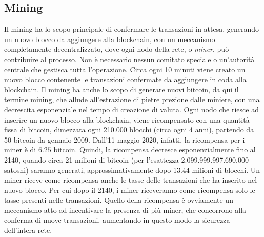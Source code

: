 \subsection{Mining}
Il mining ha lo scopo principale di confermare le transazioni in attesa, generando un nuovo blocco da aggiungere alla blockchain, con un meccanismo completamente decentralizzato, dove ogni nodo della rete, o \emph{miner}, può contribuire al processo. Non è necessario nessun comitato speciale o un'autorità centrale che gestisca tutta l'operazione. Circa ogni 10 minuti viene creato un nuovo blocco contenente le transazioni confermate da aggiungere in coda alla blockchain.
Il mining ha anche lo scopo di generare nuovi bitcoin, da qui il termine mining, che allude all'estrazione di pietre prezione dalle miniere, con una decrescita esponenziale nel tempo di creazione di valuta. Ogni nodo che riesce ad inserire un nuovo blocco alla blockchain, viene ricompensato con una quantità fissa di bitcoin, dimezzata ogni 210.000 blocchi (circa ogni 4 anni), partendo da 50 bitcoin da gennaio 2009. Dall'11 maggio 2020, infatti, la ricompensa per i miner è di $6.25$ bitcoin. Quindi, la ricompensa decresce esponenzialmente fino al 2140, quando circa 21 milioni di bitcoin (per l'esattezza 2.099.999.997.690.000 satoshi) saranno generati, approssimativamente dopo 13.44 milioni di blocchi. Un miner riceve come ricompensa anche le tasse delle transazioni che ha inserito nel nuovo blocco. Per cui dopo il 2140, i miner riceveranno come ricompensa solo le tasse presenti nelle transazioni. Quello della ricompensa è ovviamente un meccanismo atto ad incentivare la presenza di più miner, che concorrono alla conferma di nuove transazioni, aumentando in questo modo la sicurezza dell'intera rete.


